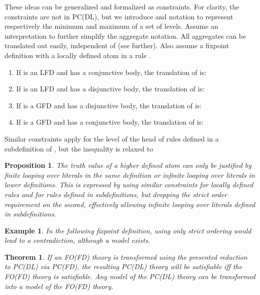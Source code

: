 \documentclass{tlp}
\newtheorem{theorem}[lemma]{Theorem}
\newtheorem{proposition}[lemma]{Proposition}
\newtheorem{example}[lemma]{Example}
\begin{document}
These ideas can be generalized and formalized as constraints. For clarity, the constraints are not in PC(DL), but we introduce  and  notation to represent respectively the minimum and maximum of a set of levels. Assume an interpretation  to further simplify the aggregate notation. All aggregates can be translated out easily, independent of  (see further). Also assume a fixpoint definition  with a locally defined atom  in a rule .
\begin{enumerate}
\item If  is an LFD and  has a conjunctive body, the translation of  is:

\item If  is an LFD and  has a disjunctive body, the translation of  is:

\item If  is a GFD and  has a disjunctive body, the translation of  is:

\item If  is a GFD and  has a conjunctive body, the translation of  is:

\end{enumerate}

Similar constraints apply for the level of the head  of rules defined in a subdefinition of , but the inequality  is relaxed to 

\begin{proposition}
The truth value of a higher defined atom can only be justified by finite looping over literals in the same definition or infinite looping over literals in lower definitions. This is expressed by using similar constraints for locally defined rules and for rules defined in subdefinitions, but dropping the strict order requirement on the second, effectively allowing infinite looping over literals defined in subdefinitions.
\end{proposition}

\begin{example}
In the following fixpoint definition, using only strict ordering would lead to a contradiction, although a model exists.

\end{example}

\begin{theorem}
If an FO(FD) theory is transformed using the presented reduction to PC(DL) via PC(FD), the resulting PC(DL) theory will be satisfiable iff the FO(FD) theory is satisfiable. Any model of the PC(DL) theory can be transformed into a model of the FO(FD) theory. \end{theorem}
\end{document}
